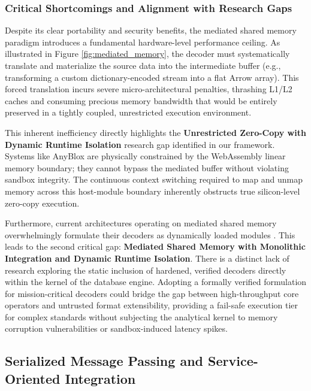 \documentclass[onecolumn]{IEEEtran}
\numberwithin{equation}{section}
\theoremstyle{definition}
\theoremstyle{remark}
\begin{document}
\subsubsection{Critical Shortcomings and Alignment with Research Gaps}

Despite its clear portability and security benefits, the mediated shared memory paradigm introduces a fundamental hardware-level performance ceiling. As illustrated in Figure \ref{fig:mediated_memory}, the decoder must systematically translate and materialize the source data into the intermediate buffer (e.g., transforming a custom dictionary-encoded stream into a flat Arrow array). This forced translation incurs severe micro-architectural penalties, thrashing L1/L2 caches and consuming precious memory bandwidth that would be entirely preserved in a tightly coupled, unrestricted execution environment.

This inherent inefficiency directly highlights the \textbf{Unrestricted Zero-Copy with Dynamic Runtime Isolation} research gap identified in our framework. Systems like AnyBlox \cite{gienieczko2025anyblox} are physically constrained by the WebAssembly linear memory boundary; they cannot bypass the mediated buffer without violating sandbox integrity. The continuous context switching required to map and unmap memory across this host-module boundary inherently obstructs true silicon-level zero-copy execution. 

Furthermore, current architectures operating on mediated shared memory overwhelmingly formulate their decoders as dynamically loaded modules \cite{gienieczko2025anyblox, hedam2023delilah, sichert2024efficient}. This leads to the second critical gap: \textbf{Mediated Shared Memory with Monolithic Integration and Dynamic Runtime Isolation}. There is a distinct lack of research exploring the static inclusion of hardened, verified decoders directly within the kernel of the database engine. Adopting a formally verified formulation for mission-critical decoders could bridge the gap between high-throughput core operators \cite{lamb2024apache} and untrusted format extensibility, providing a fail-safe execution tier for complex standards without subjecting the analytical kernel to memory corruption vulnerabilities or sandbox-induced latency spikes.

\subsection{Serialized Message Passing and Service-Oriented Integration}
\end{document}
